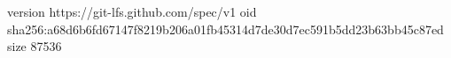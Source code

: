 version https://git-lfs.github.com/spec/v1
oid sha256:a68d6b6fd67147f8219b206a01fb45314d7de30d7ec591b5dd23b63bb45c87ed
size 87536
